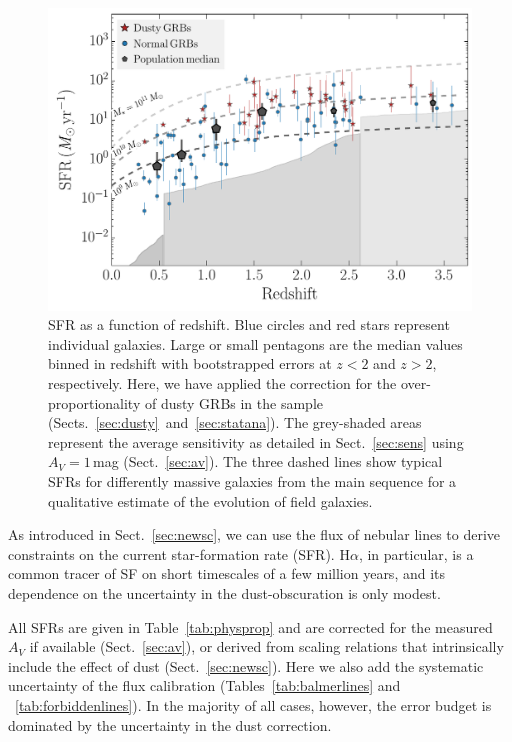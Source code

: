 \documentclass[traditabstract, longauth]{aa}
\newcommand{\ha}{H$\alpha$}
\begin{document}
\begin{figure}
\includegraphics[angle=0, width=0.99\columnwidth]{Figs/SFR_z.pdf}
\caption{SFR as a function of redshift. Blue circles and red stars represent individual galaxies. Large or small pentagons are the median values binned in redshift with bootstrapped errors at $z<2$ and $z>2$, respectively.  {Here, we have applied the correction for the over-proportionality of dusty GRBs in the sample (Sects.~\ref{sec:dusty}~and~\ref{sec:statana})}. The grey-shaded areas represent the average sensitivity as detailed in Sect.~\ref{sec:sens} using $A_V=1$\,mag (Sect.~\ref{sec:av}). The three dashed lines show typical SFRs for differently massive galaxies from the main sequence \citep{2014ApJS..214...15S} for a qualitative estimate of the evolution of field galaxies.}
\label{fig:sfrz}
\end{figure}

As introduced in Sect.~\ref{sec:newsc}, we can use the flux of nebular lines to derive constraints on the current star-formation rate (SFR). \ha, in particular, is a common tracer of SF on short timescales of a few million years, and its dependence on the uncertainty in the dust-obscuration is only modest. 

All SFRs are given in Table~\ref{tab:physprop} and are corrected for the measured $A_V$ if available (Sect.~\ref{sec:av}), or derived from scaling relations that intrinsically include the effect of dust (Sect.~\ref{sec:newsc}). Here we also add the systematic uncertainty of the flux calibration (Tables~\ref{tab:balmerlines} and ~\ref{tab:forbiddenlines}). In the majority of all cases, however, the error budget is dominated by the uncertainty in the dust correction.
\end{document}
